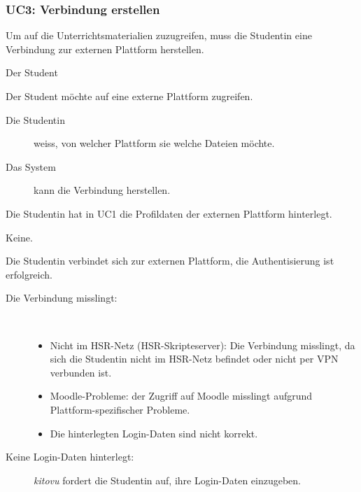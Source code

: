 \documentclass[a4paper]{article}
\begin{document}
\subsubsection{UC3: Verbindung erstellen}
\begin{description}[uclist]
  \item[Goal] Um auf die Unterrichtsmaterialien zuzugreifen, muss die Studentin eine Verbindung zur externen Plattform herstellen.
  \item[Primary Actor] Der Student
  \item[Trigger] Der Student möchte auf eine externe Plattform zugreifen.
  \item[Stakeholders and Interests]
    \begin{description}
      \item[Die Studentin] weiss, von welcher Plattform sie welche Dateien möchte.
      \item[Das System] kann die Verbindung herstellen.
    \end{description}
  \item[Preconditions] Die Studentin hat in UC1 die Profildaten der externen Plattform hinterlegt.
  \item[Postconditions] Keine.
  \item[Main Success Scenario] Die Studentin verbindet sich zur externen Plattform, die Authentisierung ist erfolgreich.
  \item[Extensions]
    \begin{description}
      \item[Die Verbindung misslingt:] \strut \\[-1em]
        \begin{itemize}[leftmargin=1em]
          \item Nicht im HSR-Netz (HSR-Skripteserver): Die Verbindung misslingt, da sich die Studentin nicht im HSR-Netz befindet oder nicht per VPN verbunden ist.
          \item Moodle-Probleme: der Zugriff auf Moodle misslingt aufgrund Plattform-spezifischer Probleme.
          \item Die hinterlegten Login-Daten sind nicht korrekt.
        \end{itemize}
      \item[Keine Login-Daten hinterlegt:] \emph{kitovu} fordert die Studentin auf, ihre Login-Daten einzugeben.

\end{description}
\end{description}
\end{document}
